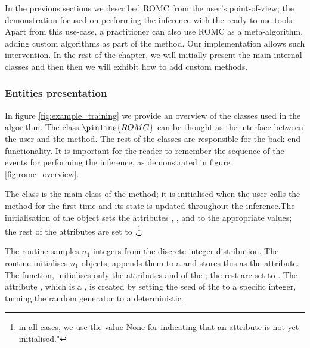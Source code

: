 In the previous sections we described ROMC from the user's
point-of-view; the demonstration focused on performing the inference
with the ready-to-use tools. Apart from this use-case, a practitioner
can also use ROMC as a meta-algorithm, adding custom algorithms as
part of the method. Our implementation allows such intervention. In
the rest of the chapter, we will initially present the main internal
classes and then then we will exhibit how to add custom methods.

\subsubsection{Entities presentation}

In figure \ref{fig:example_training} we provide an overview of the
classes used in the algorithm. The class $\pinline{ROMC}$ can be
thought as the interface between the user and the method. The rest of
the classes are responsible for the back-end functionality. It is
important for the reader to remember the sequence of the events for
performing the inference, as demonstrated in figure
\ref{fig:romc_overview}.

The class  is the main class of the method; it is
initialised when the user calls the method for the first time and its
state is updated throughout the inference.The initialisation of the
 object sets the attributes ,
,  and  to
the appropriate values; the rest of the attributes are set to
.\footnote{in all cases, we use the value None for
  indicating that an attribute is not yet initialised."}.

The  routine samples $n_1$ integers from
the discrete integer distribution. The 
routine initialises $n_1$  objects,
appends them to a  and stores this  as the
 attribute. The
 function, initialises only the
attributes  and  of the
; the rest are set to . The
attribute , which is a , is
created by setting the seed of the  to a
specific integer, turning the random generator to a deterministic.

